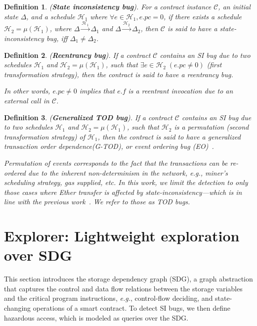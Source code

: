 \documentclass[conference, romanappendices]{tex/IEEEtran}
\theoremstyle{bfnote}
\newcommand{\explorer}{{\sc Explorer}\xspace}
\newcommand{\smart}{smart contract}
\newcommand{\ether}{{Ether}\xspace}
\newcommand{\reentrancy}{{reentrancy}\xspace}
\newcommand{\tod}{{transaction order dependence}\xspace}
\newcommand{\haz}{{hazardous access}\xspace}
\newcommand{\si}{{state-inconsistency}\xspace}
\newcommand{\etc}{\textit{etc.}}
\newcommand{\eg}{\textit{e.g.}}
\newtheorem{definition}{Definition}
\begin{document}
\vspace{-3mm}
\begin{definition}
	(\textbf{State inconsistency bug}).
	For a contract instance $\mathcal{C}$, an initial state $\Delta$, and a schedule $\mathcal{H}_1$ where $\forall e \in \mathcal{H}_1, e.pc = 0$, if there exists a schedule $\mathcal{H}_2 = \mu(\mathcal{H}_1)$, where $\Delta \xrightarrow{\mathcal{H}_1} \Delta_1$ and $\Delta \xrightarrow{\mathcal{H}_2} \Delta_2$, then $\mathcal{C}$ is said to have a \si bug, iff $\Delta_1 \neq \Delta_2$.
\end{definition}

\vspace{-4mm}
\begin{definition}
	(\textbf{Reentrancy bug}).
	If a contract $\mathcal{C}$ contains an SI bug due to two schedules $\mathcal{H}_1$ and $\mathcal{H}_2 = \mu(\mathcal{H}_1)$, such that $\exists e \in \mathcal{H}_2 \;(e.pc \neq 0)$ (first transformation strategy), then the contract is said to have a \reentrancy bug.
	
	
	In other words, $e.pc \neq 0$ implies that $e.f$ is a reentrant invocation due to an external call in $\mathcal{C}$.
\end{definition}

\vspace{-4mm}
\begin{definition}
	(\textbf{Generalized TOD bug}).
	If a contract $\mathcal{C}$ contains an SI bug due to two schedules $\mathcal{H}_1$ and $\mathcal{H}_2 = \mu(\mathcal{H}_1)$, such that $\mathcal{H}_2$ is a permutation  (second transformation strategy) of $\mathcal{H}_1$, then the contract is said to have a generalized \tod (G-TOD), or event ordering bug (EO)~\cite{ethracer}.
	
	Permutation of events corresponds to the fact that the transactions can be re-ordered due to the inherent non-determinism in the network, \eg, miner's scheduling strategy, gas supplied, \etc{}
	In this work, we limit the detection to only those cases where \ether transfer is affected by \si---which is in line with the previous work~\cite{securify, oyente}.
	We refer to those as {TOD\EndAccSupp{}} bugs.
\end{definition} 	\section{\explorer: Lightweight exploration over SDG}
\label{static_analysis}
This section introduces the storage dependency graph ({SDG\EndAccSupp{}}), a graph abstraction that captures the control and data flow relations between the storage variables and the critical program instructions, \eg, control-flow deciding, and state-changing operations of a \smart.
To detect SI bugs, we then define \haz, which is modeled as queries over the SDG.
\end{document}
